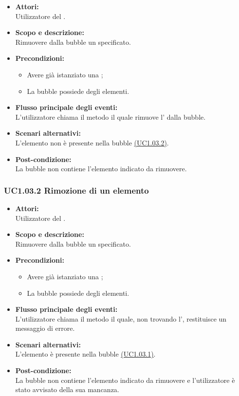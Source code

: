 \begin{itemize}
	\item \textbf{Attori:}
	\\Utilizzatore del .
	\item \textbf{Scopo e descrizione:} 
	\\Rimuovere dalla bubble un  specificato.
	\item \textbf{Precondizioni:}
	\begin{itemize}
		\item Avere già istanziato una ;
		\item La bubble possiede degli elementi.
	\end{itemize}
	\item \textbf{Flusso principale degli eventi:}
	\\L’utilizzatore chiama il metodo il quale rimuove l’ dalla bubble.
	\item \textbf{Scenari alternativi:}
	\\L'elemento non è presente nella bubble \hyperref[UC1.03.2]{(UC1.03.2)}.
	\item \textbf{Post-condizione:}
	\\La bubble non contiene l’elemento indicato da rimuovere.
\end{itemize}

\subsubsection{UC1.03.2 Rimozione di un elemento} \label{UC1.03.2}

\begin{itemize}
	\item \textbf{Attori:}
	\\Utilizzatore del .
	\item \textbf{Scopo e descrizione:} 
	\\Rimuovere dalla bubble un  specificato.
	\item \textbf{Precondizioni:}
	\begin{itemize}
		\item Avere già istanziato una ;
		\item La bubble possiede degli elementi.
	\end{itemize}
	\item \textbf{Flusso principale degli eventi:}
	\\L’utilizzatore chiama il metodo il quale, non trovando l’, restituisce un messaggio di errore.
	\item \textbf{Scenari alternativi:}
	\\L'elemento è presente nella bubble \hyperref[UC1.03.1]{(UC1.03.1)}.
	\item \textbf{Post-condizione:}
	\\La bubble non contiene l’elemento indicato da rimuovere e l’utilizzatore è stato avvisato della sua mancanza.
\end{itemize}


